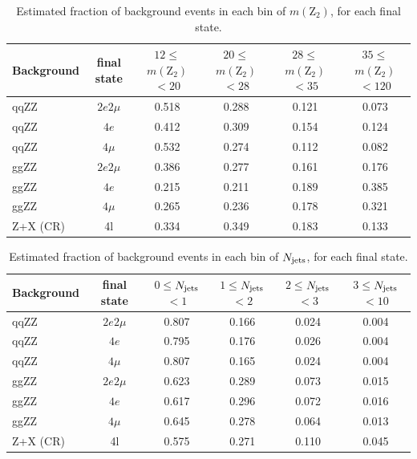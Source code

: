 \begin{table}[!h!tb]  
\begin{center}  
\small  
    \caption{  
        Estimated fraction of background events in each bin of $m(\mathrm{Z}_{2})$, for each final state.  
\label{tab:fractions_massZ2}  
}  
\begin{tabular}{|l|c|c|c|c|c|}  
\hline  
Background & final state & $12\leq$$m(\mathrm{Z}_{2})$$<20$ & $20\leq$$m(\mathrm{Z}_{2})$$<28$ & $28\leq$$m(\mathrm{Z}_{2})$$<35$ & $35\leq$$m(\mathrm{Z}_{2})$$<120$ \\ \hline  
qqZZ& $2e2\mu$  & 0.518  & 0.288  & 0.121  & 0.073  \\  
qqZZ& $4e$  & 0.412  & 0.309  & 0.154  & 0.124  \\  
qqZZ& $4\mu$  & 0.532  & 0.274  & 0.112  & 0.082  \\  
ggZZ& $2e2\mu$  & 0.386  & 0.277  & 0.161  & 0.176  \\  
ggZZ& $4e$  & 0.215  & 0.211  & 0.189  & 0.385  \\  
ggZZ& $4\mu$  & 0.265  & 0.236  & 0.178  & 0.321  \\  
Z+X (CR)& 4l  & 0.334  & 0.349  & 0.183  & 0.133  \\  
\hline  
\end{tabular}  
\normalsize  
\end{center}  
\end{table}  

\begin{table}[!h!tb]  
\begin{center}  
\small  
    \caption{  
        Estimated fraction of background events in each bin of $N_{\rm jets}$, for each final state.  
\label{tab:fractions_njets_reco_pt30_eta4p7}  
}  
\begin{tabular}{|l|c|c|c|c|c|}  
\hline  
Background & final state & $0\leq$$N_{\rm jets}$$<1$ & $1\leq$$N_{\rm jets}$$<2$ & $2\leq$$N_{\rm jets}$$<3$ & $3\leq$$N_{\rm jets}$$<10$ \\ \hline  
qqZZ& $2e2\mu$  & 0.807  & 0.166  & 0.024  & 0.004  \\  
qqZZ& $4e$  & 0.795  & 0.176  & 0.026  & 0.004  \\  
qqZZ& $4\mu$  & 0.807  & 0.165  & 0.024  & 0.004  \\  
ggZZ& $2e2\mu$  & 0.623  & 0.289  & 0.073  & 0.015  \\  
ggZZ& $4e$  & 0.617  & 0.296  & 0.072  & 0.016  \\  
ggZZ& $4\mu$  & 0.645  & 0.278  & 0.064  & 0.013  \\  
Z+X (CR)& 4l  & 0.575  & 0.271  & 0.110  & 0.045  \\  
\hline  
\end{tabular}  
\normalsize  
\end{center}  
\end{table}  

